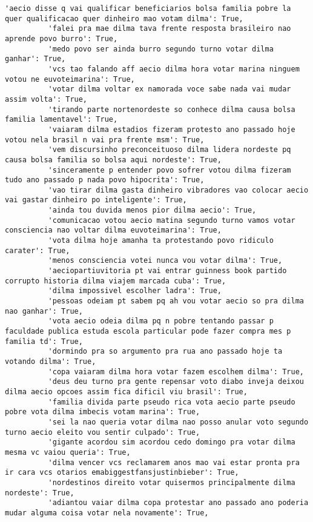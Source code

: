 \documentclass[11pt]{article}
\begin{document}
\begin{Verbatim}[commandchars=\\\{\}]
          'aecio disse q vai qualificar beneficiarios bolsa familia pobre la quer qualificacao quer dinheiro mao votam dilma': True,
          'falei pra mae dilma tava frente resposta brasileiro nao aprende povo burro': True,
          'medo povo ser ainda burro segundo turno votar dilma ganhar': True,
          'vcs tao falando aff aecio dilma hora votar marina ninguem votou ne euvoteimarina': True,
          'votar dilma voltar ex namorada voce sabe nada vai mudar assim volta': True,
          'tirando parte nortenordeste so conhece dilma causa bolsa familia lamentavel': True,
          'vaiaram dilma estadios fizeram protesto ano passado hoje votou nela brasil n vai pra frente msm': True,
          'vem discursinho preconceituoso dilma lidera nordeste pq causa bolsa familia so bolsa aqui nordeste': True,
          'sinceramente p entender povo sofrer votou dilma fizeram tudo ano passado p nada povo hipocrita': True,
          'vao tirar dilma gasta dinheiro vibradores vao colocar aecio vai gastar dinheiro po inteligente': True,
          'ainda tou duvida menos pior dilma aecio': True,
          'comunicacao votou aecio matina segundo turno vamos votar consciencia nao voltar dilma euvoteimarina': True,
          'vota dilma hoje amanha ta protestando povo ridiculo carater': True,
          'menos consciencia votei nunca vou votar dilma': True,
          'aeciopartiuvitoria pt vai entrar guinness book partido corrupto historia dilma viajem marcada cuba': True,
          'dilma impossivel escolher ladra': True,
          'pessoas odeiam pt sabem pq ah vou votar aecio so pra dilma nao ganhar': True,
          'vota aecio odeia dilma pq n pobre tentando passar p faculdade publica estuda escola particular pode fazer compra mes p familia td': True,
          'dormindo pra so argumento pra rua ano passado hoje ta votando dilma': True,
          'copa vaiaram dilma hora votar fazem escolhem dilma': True,
          'deus deu turno pra gente repensar voto diabo inveja deixou dilma aecio opcoes assim fica dificil viu brasil': True,
          'familia divida parte pseudo rica vota aecio parte pseudo pobre vota dilma imbecis votam marina': True,
          'sei la nao queria votar dilma nao posso anular voto segundo turno aecio eleito vou sentir culpado': True,
          'gigante acordou sim acordou cedo domingo pra votar dilma mesma vc vaiou queria': True,
          'dilma vencer vcs reclamarem anos mao vai estar pronta pra ir cara vcs otarios emabiggestfansjustinbieber': True,
          'nordestinos direito votar quisermos principalmente dilma nordeste': True,
          'adiantou vaiar dilma copa protestar ano passado ano poderia mudar alguma coisa votar nela novamente': True,

\end{Verbatim}
\end{document}
